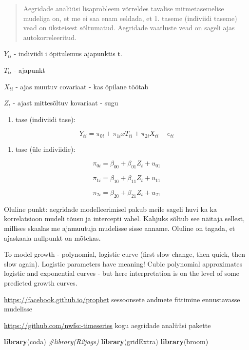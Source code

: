 \documentclass[]{book}
\newenvironment{Shaded}{\begin{snugshade}}{\end{snugshade}}
\newcommand{\CommentTok}[1]{\textcolor[rgb]{0.56,0.35,0.01}{\textit{#1}}}
\newcommand{\KeywordTok}[1]{\textcolor[rgb]{0.13,0.29,0.53}{\textbf{#1}}}
\newcommand{\NormalTok}[1]{#1}
\providecommand{\tightlist}{%
  \setlength{\itemsep}{0pt}\setlength{\parskip}{0pt}}
\begin{document}
\begin{quote}
Aegridade analüüsi lisaprobleem võrreldes tavalise mitmetasemelise mudeliga on, et me ei saa enam eeldada, et 1. taseme (indiviidi taseme) vead on üksteisest sõltumatud. Aegridade vaatluste vead on sageli ajas autokorreleeritud.
\end{quote}

\(Y_{ti}\) - indiviidi i õpitulemus ajapunktis t.

\(T_{ti}\) - ajapunkt

\(X_{ti}\) - ajas muutuv covariaat - kas õpilane töötab

\(Z_t\) - ajast mittesõltuv kovariaat - sugu

\begin{enumerate}
\def\labelenumi{\arabic{enumi}.}
\tightlist
\item
  tase (indiviidi tase):
\end{enumerate}

\[Y_{ti} = \pi_{0i} + \pi_{1i} x T_{ti} + \pi_{2i} X_{ti} + e_{ti} \]

\begin{enumerate}
\def\labelenumi{\arabic{enumi}.}
\setcounter{enumi}{1}
\tightlist
\item
  tase (üle indiviidie):
\end{enumerate}

\[\pi_{0i} = \beta_{00} + \beta_{01} Z_t + u_{01}\]

\[\pi_{1i} =\beta_{10} + \beta_{11} Z_t + u_{11}\]

\[\pi_{2i} = \beta_{20} + \beta_{21} Z_t + u_{21}\]

Oluline punkt: aegridade modelleerimisel pakub meile sageli huvi ka ka korrelatsioon mudeli tõusu ja intercepti vahel. Kahjuks sõltub see näitaja sellest, millises skaalas me ajamuutuja mudelisse sisse anname. Oluline on tagada, et ajaskaala nullpunkt on mõtekas.

To model growth - polynomial, logistic curve (first slow change, then quick, then slow again). Logistic parameters have meaning! Cubic polynomial approximates logistic and exponential curves - but here interpretation is on the level of some predicted growth curves.

\url{https://facebook.github.io/prophet}
sessoonsete andmete fittimine ennustavasse mudelisse

\url{https://github.com/nwfsc-timeseries}
kogu aegridade analüüsi pakette

\begin{Shaded}
\begin{Highlighting}[]
\KeywordTok{library}\NormalTok{(coda)}
\CommentTok{#library(R2jags)}
\KeywordTok{library}\NormalTok{(gridExtra)}
\KeywordTok{library}\NormalTok{(broom)}
\end{Highlighting}
\end{Shaded}
\end{document}
